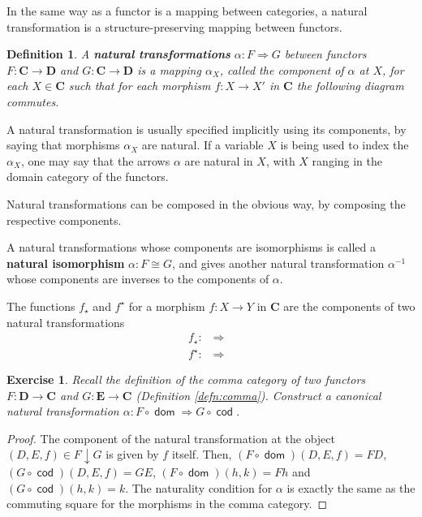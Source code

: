 \documentclass[a5paper,oneside,11pt]{article}
\newtheorem{ex}{Exercise}
\newtheorem{defn}{Definition}
\newcommand\1{\mathord{\mathrm{1}}}
\newcommand\cat[1]{\mathbf{#1}}
\newcommand\Hom[3]{\mathop{\mathsf{Hom}_{\cat{#1}}(#2, #3)}}
\newcommand\dom{\mathop{\mathsf{dom}}}
\newcommand\cod{\mathop{\mathsf{cod}}}
\begin{document}
In the same way as a functor is a mapping between categories, a natural transformation
is a structure-preserving mapping between functors.
\begin{defn}
    \label{defn:natural}
    A \textbf{natural transformations} $\alpha : F \Longrightarrow G$
    between functors $F : \cat{C} \longrightarrow \cat{D}$
    and $G : \cat{C} \longrightarrow \cat{D}$ is a mapping $\alpha_X$, called
    the component of $\alpha$ at $X$, for each $X \in \cat{C}$ such that for each
    morphism $f : X \rightarrow X'$ in $\cat{C}$ the
    following diagram commutes.
    \begin{figure}[H]
        \centering
    \end{figure}
\end{defn}
A natural transformation is usually specified implicitly using its components, by
saying that morphisms $\alpha_X$ are natural. If a variable $X$ is being used
to index the $\alpha_X$, one may say that the arrows $\alpha$ are natural in $X$,
with $X$ ranging in the domain category of the functors.

Natural transformations can be composed in the obvious way, by composing the
respective components.

A natural transformations whose components are isomorphisms is called a
\textbf{natural isomorphism} $\alpha : F \cong G$, and gives another natural
transformation $\alpha^{-1}$ whose components are inverses to the components of $\alpha$.

The functions $f_\star$ and $f^\star$ for a
morphism $f : X \rightarrow Y$ in $\cat{C}$ are the components of two natural transformations
\begin{align*}
    f_\star : \Hom{C}{-}{X} \Longrightarrow \Hom{C}{-}{Y} \\
    f^\star : \Hom{C}{Y}{-} \Longrightarrow \Hom{C}{X}{-}
\end{align*}

\begin{ex}
    Recall the definition of the comma category of two functors
    $F : \cat{D} \longrightarrow \cat{C}$ and $G : \cat{E} \longrightarrow \cat{C}$
    (Definition \ref{defn:comma}). Construct a canonical natural transformation
    $\alpha : F \circ \dom \Longrightarrow G \circ \cod$.
\end{ex}
\begin{proof}
    The component of the natural transformation at the object
    $(D, E, f) \in F \downarrow G$ is given by $f$ itself.
    Then, $(F \circ \dom)(D, E, f) = FD$, $(G \circ \cod)(D, E, f) = GE$,
    $(F \circ \dom)(h, k) = Fh$ and $(G \circ \cod)(h, k) = k$.
    The naturality condition for $\alpha$ is exactly the same as the commuting square
    for the morphisms in the comma category.
\end{proof}
\end{document}

